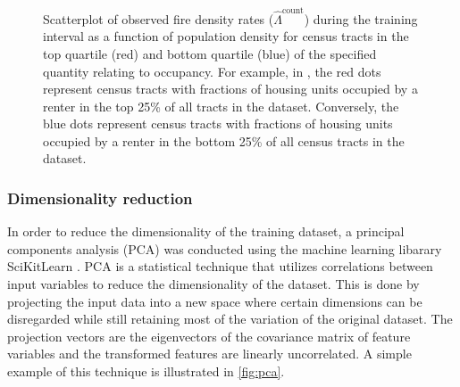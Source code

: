 \documentclass{svjour3}
\begin{document}
\begin{figure}[!ht]
\begin{center}
{          }
      \end{center}
      \caption{Scatterplot of observed fire density rates ($\hat\Lambda^{\text{count}}$) during the training interval as a function of population density for census tracts in the top quartile (red) and bottom quartile (blue) of the specified quantity relating to occupancy. For example, in \protect{}, the red dots represent census tracts with fractions of housing units occupied by a renter in the top 25\% of all tracts in the dataset. Conversely, the blue dots represent census tracts with fractions of housing units occupied by a renter in the bottom 25\% of all census tracts in the dataset.}
     \label{fig:occupancy}
  \end{figure}
 
 
 \clearpage
  \subsubsection{Dimensionality reduction}
    In order to reduce the dimensionality of the training dataset, a principal components analysis (PCA) was conducted using the machine learning libarary SciKitLearn \cite{pedregosa2011scikit}. PCA is a statistical technique that utilizes correlations between input variables to reduce the dimensionality of the dataset. This is done by projecting the input data into a new space where certain dimensions can be disregarded while still retaining most of the variation of the original dataset. The projection vectors are the eigenvectors of the covariance matrix of feature variables and the transformed features are linearly uncorrelated. A simple example of this technique is illustrated in \ref{fig:pca}.
  
\end{document}
